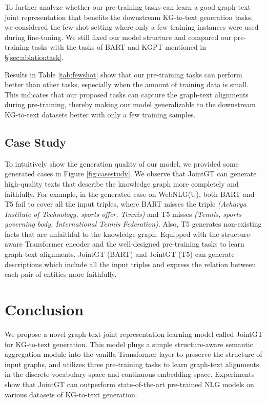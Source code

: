 \documentclass[11pt,a4paper]{article}
\begin{document}
To further analyze whether our pre-training tasks can learn a good graph-text joint representation that benefits the downstream KG-to-text generation tasks, we considered the few-shot setting where only a few training instances were used during fine-tuning. We still fixed our model structure and compared our pre-training tasks with the tasks of BART and KGPT mentioned in \S \ref{sec:ablationtask}.

Results in Table \ref{tab:fewshot} show that our pre-training tasks can perform better than other tasks, especially when the amount of training data is small. This indicates that our proposed tasks can capture the graph-text alignments during pre-training, thereby making our model generalizable to the downstream KG-to-text datasets better with only a few training samples.



\subsection{Case Study}


To intuitively show the generation quality of our model, we provided some generated cases in Figure \ref{fig:casestudy}. We observe that JointGT can generate high-quality texts that describe the knowledge graph more completely and faithfully. For example, in the generated case on WebNLG(U), both BART and T5 fail to cover all the input triples, where BART misses the triple \textit{(Acharya Institute of Technology, sports offer, Tennis)} and T5 misses \textit{(Tennis, sports governing body, International Tennis Federation)}. Also, T5 generates non-existing facts that are unfaithful to the knowledge graph. 
Equipped with the structure-aware Transformer encoder and the well-designed pre-training tasks to learn graph-text alignments, JointGT (BART) and JointGT (T5) can generate descriptions which include all the input triples and express the relation between each pair of entities more faithfully.


\section{Conclusion}

We propose a novel graph-text joint representation learning model called JointGT for KG-to-text generation. This model plugs a simple structure-aware semantic aggregation module into the vanilla Transformer layer to preserve the structure of input graphs, and utilizes three pre-training tasks to learn graph-text alignments in the discrete vocabulary space and continuous embedding space. Experiments show that JointGT can outperform state-of-the-art pre-trained NLG models on various datasets of KG-to-text generation.
\end{document}
